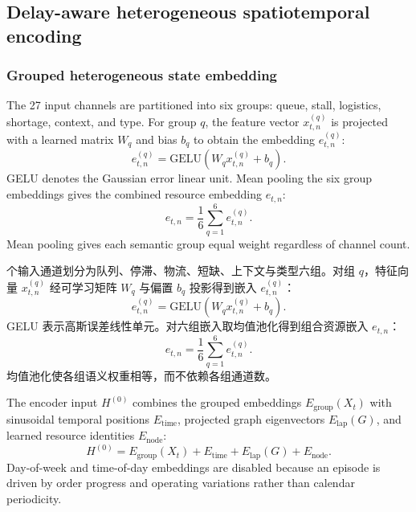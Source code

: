 \documentclass[a4paper,fleqn]{cas-dc}
\newcommand{\zhpara}[1]{%
  \par\begingroup\small\color{black!72}\noindent #1\par\endgroup}
\begin{document}
\subsection{Delay-aware heterogeneous spatiotemporal encoding}



\subsubsection{Grouped heterogeneous state embedding}

The 27 input channels are partitioned into six groups: queue, stall, logistics, shortage, context, and type. For group $q$, the feature vector $x^{(q)}_{t,n}$ is projected with a learned matrix $W_q$ and bias $b_q$ to obtain the embedding $e^{(q)}_{t,n}$:
\begin{equation}
e^{(q)}_{t,n}=\mathrm{GELU}
\left(W_q x^{(q)}_{t,n}+b_q\right).
\end{equation}
GELU denotes the Gaussian error linear unit. Mean pooling the six group embeddings gives the combined resource embedding $e_{t,n}$:
\begin{equation}
e_{t,n}=\frac{1}{6}\sum_{q=1}^{6}e^{(q)}_{t,n}.
\end{equation}
Mean pooling gives each semantic group equal weight regardless of channel count.

\zhpara{27 个输入通道划分为队列、停滞、物流、短缺、上下文与类型六组。对组 $q$，特征向量 $x^{(q)}_{t,n}$ 经可学习矩阵 $W_q$ 与偏置 $b_q$ 投影得到嵌入 $e^{(q)}_{t,n}$：
\begin{equation}
e^{(q)}_{t,n}=\mathrm{GELU}
\left(W_q x^{(q)}_{t,n}+b_q\right).
\end{equation}
GELU 表示高斯误差线性单元。对六组嵌入取均值池化得到组合资源嵌入 $e_{t,n}$：
\begin{equation}
e_{t,n}=\frac{1}{6}\sum_{q=1}^{6}e^{(q)}_{t,n}.
\end{equation}
均值池化使各组语义权重相等，而不依赖各组通道数。}


The encoder input $H^{(0)}$ combines the grouped embeddings $E_{\mathrm{group}}(X_t)$ with sinusoidal temporal positions $E_{\mathrm{time}}$, projected graph eigenvectors $E_{\mathrm{lap}}(G)$, and learned resource identities $E_{\mathrm{node}}$:
\begin{equation}
H^{(0)}=E_{\mathrm{group}}(X_t)+
E_{\mathrm{time}}+E_{\mathrm{lap}}(G)+E_{\mathrm{node}}.
\end{equation}
Day-of-week and time-of-day embeddings are disabled because an episode is driven by order progress and operating variations rather than calendar periodicity.
\end{document}
